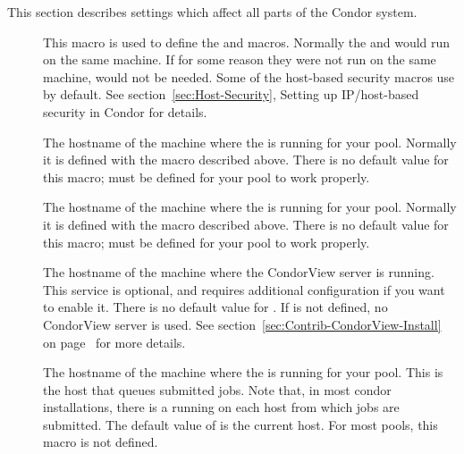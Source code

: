 
This section describes settings which affect all parts of the Condor
system. 
\begin{description}
  
\item[] \label{param:CondorHost} This macro is
  used to define the  and
   macros.  Normally the 
  and  would run on the same machine.  If for some
  reason they were not run on the same machine,
   would not be needed.  Some
  of the host-based security macros use  by
  default.  See section~\ref{sec:Host-Security}, Setting up
  IP/host-based security in Condor for details.
  
\item[] \label{param:CollectorHost} The
  hostname of the machine where the  is running for
  your pool.  Normally it is defined with the 
  macro described above.  There is no default value for this macro;
   must be defined for your pool to work
  properly.

\item[] \label{param:NegotiatorHost} The
  hostname of the machine where the  is running for
  your pool.  Normally it is defined with the 
  macro described above.  There is no default value for this macro;
   must be defined for your pool to work
  properly.

\item[] \label{param:CondorViewHost} The
  hostname of the machine where the CondorView server is running.
  This service is optional, and requires additional configuration if
  you want to enable it.  There is no default value for
  .  If  is not
  defined, no CondorView server is used.
  See section~\ref{sec:Contrib-CondorView-Install} on
  page~\pageref{sec:Contrib-CondorView-Install} for more details.

\item[] \label{param:ScheddHost} The
  hostname of the machine where the  is running for
  your pool.  This is the host that queues submitted jobs.  Note that,
  in most condor installations, there is a  running on
  each host from which jobs are submitted.  The default value of
   is the current host.  For most pools, this
  macro is not defined.


\end{description}

